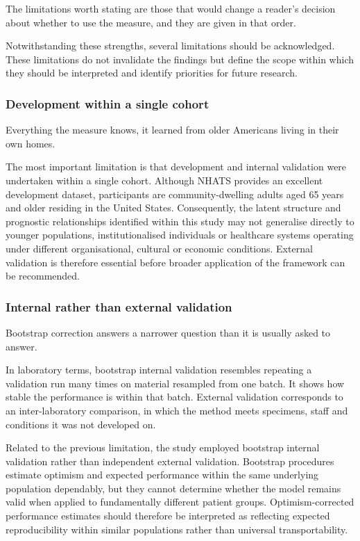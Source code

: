 The limitations worth stating are those that would change a reader's decision
about whether to use the measure, and they are given in that order.

Notwithstanding these strengths, several limitations should be acknowledged. These limitations do not invalidate the findings but define the scope within which they should be interpreted and identify priorities for future research.

\subsubsection{Development within a single cohort}

Everything the measure knows, it learned from older Americans living in their own
homes.

The most important limitation is that development and internal validation were undertaken within a single cohort. Although NHATS provides an excellent development dataset, participants are community-dwelling adults aged 65 years and older residing in the United States. Consequently, the latent structure and prognostic relationships identified within this study may not generalise directly to younger populations, institutionalised individuals or healthcare systems operating under different organisational, cultural or economic conditions. External validation is therefore essential before broader application of the framework can be recommended.

\subsubsection{Internal rather than external validation}

Bootstrap correction answers a narrower question than it is usually asked to
answer.

In laboratory terms, bootstrap internal validation resembles repeating a validation run many times on material resampled from one batch. It shows how stable the performance is within that batch. External validation corresponds to an inter-laboratory comparison, in which the method meets specimens, staff and conditions it was not developed on.

Related to the previous limitation, the study employed bootstrap internal validation rather than independent external validation. Bootstrap procedures estimate optimism and expected performance within the same underlying population dependably, but they cannot determine whether the model remains valid when applied to fundamentally different patient groups. Optimism-corrected performance estimates should therefore be interpreted as reflecting expected reproducibility within similar populations rather than universal transportability.

